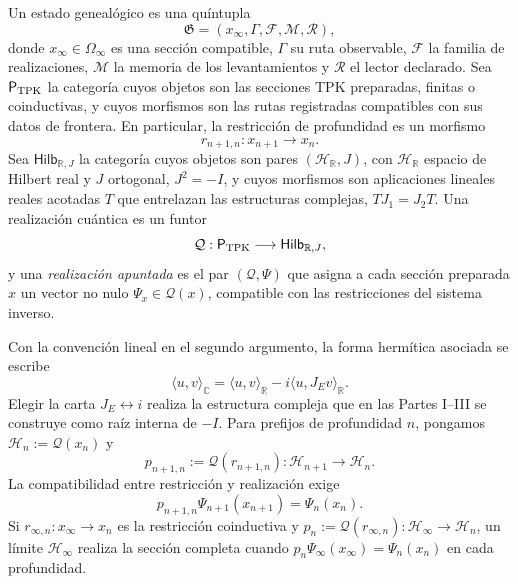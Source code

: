 \begin{definition}
Un estado genealógico es una quíntupla
\begin{equation}
 \mathfrak G=(x_\infty,\Gamma,\mathcal F,\mathcal M,\mathcal R),
 \label{eq:estado-genealogico-realizado-rev2}
\end{equation}
donde \(x_\infty\in\Omega_\infty\) es una sección compatible,
\(\Gamma\) su ruta observable, \(\mathcal F\) la familia de realizaciones,
\(\mathcal M\) la memoria de los levantamientos y \(\mathcal R\) el lector
declarado. Sea \(\mathsf P_{\rm TPK}\) la categoría cuyos objetos son las
secciones TPK preparadas, finitas o coinductivas, y cuyos morfismos son las
rutas registradas compatibles con sus datos de frontera. En particular, la
restricción de profundidad es un morfismo
\[
 r_{n+1,n}:x_{n+1}\longrightarrow x_n.
\]
Sea \(\mathsf{Hilb}_{\mathbb R,J}\) la categoría cuyos objetos
son pares \((\mathcal H_{\mathbb R},J)\), con \(\mathcal H_{\mathbb R}\)
espacio de Hilbert real y \(J\) ortogonal, \(J^2=-I\), y cuyos morfismos son
aplicaciones lineales reales acotadas \(T\) que entrelazan las estructuras
complejas, \(TJ_1=J_2T\). Una realización cuántica es un funtor
\[
 \mathcal Q:\mathsf P_{\rm TPK}\longrightarrow
 \mathsf{Hilb}_{\mathbb R,J},
\]
y una \emph{realización apuntada} es el par \((\mathcal Q,\Psi)\) que asigna
a cada sección preparada \(x\) un vector no nulo
\(\Psi_x\in\mathcal Q(x)\), compatible con las restricciones del sistema
inverso.
\end{definition}

Con la convención lineal en el segundo argumento, la forma hermítica asociada
se escribe
\[
 \langle u,v\rangle_{\mathbb C}
 =\langle u,v\rangle_{\mathbb R}
  -i\langle u,J_E v\rangle_{\mathbb R}.
\]
Elegir la carta \(J_E\leftrightarrow i\) realiza la estructura compleja que
en las Partes I--III se construye como raíz interna de \(-I\). Para prefijos de
profundidad \(n\), pongamos
\(\mathcal H_n:=\mathcal Q(x_n)\) y
\[
 p_{n+1,n}:=\mathcal Q(r_{n+1,n}):
 \mathcal H_{n+1}\longrightarrow\mathcal H_n.
\]
La compatibilidad entre restricción y realización exige
\begin{equation}
 p_{n+1,n}\Psi_{n+1}(x_{n+1})=\Psi_n(x_n).
 \label{eq:compatibilidad-realizacion-hilbert-rev2}
\end{equation}
Si \(r_{\infty,n}:x_\infty\to x_n\) es la restricción coinductiva y
\(p_n:=\mathcal Q(r_{\infty,n}):\mathcal H_\infty\to\mathcal H_n\), un
límite \(\mathcal H_\infty\) realiza la sección completa cuando
\(p_n\Psi_\infty(x_\infty)=\Psi_n(x_n)\) en cada profundidad.

